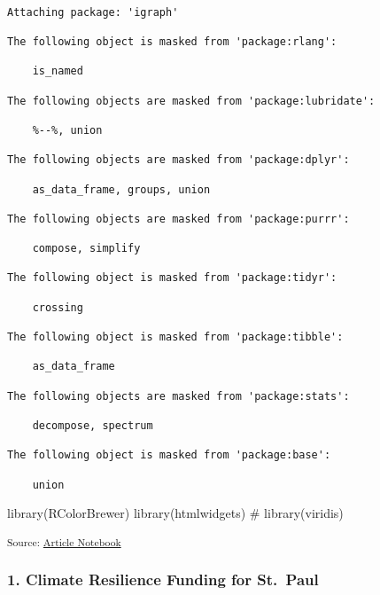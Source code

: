 \documentclass[
  letterpaper,
  DIV=11,
  numbers=noendperiod]{scrartcl}
\newenvironment{Shaded}{\begin{snugshade}}{\end{snugshade}}
\newcommand{\CommentTok}[1]{\textcolor[rgb]{0.37,0.37,0.37}{#1}}
\newcommand{\FunctionTok}[1]{\textcolor[rgb]{0.28,0.35,0.67}{#1}}
\newcommand{\NormalTok}[1]{\textcolor[rgb]{0.00,0.23,0.31}{#1}}
\begin{document}
\begin{verbatim}

Attaching package: 'igraph'

The following object is masked from 'package:rlang':

    is_named

The following objects are masked from 'package:lubridate':

    %--%, union

The following objects are masked from 'package:dplyr':

    as_data_frame, groups, union

The following objects are masked from 'package:purrr':

    compose, simplify

The following object is masked from 'package:tidyr':

    crossing

The following object is masked from 'package:tibble':

    as_data_frame

The following objects are masked from 'package:stats':

    decompose, spectrum

The following object is masked from 'package:base':

    union
\end{verbatim}

\begin{Shaded}
\begin{Highlighting}[]
\FunctionTok{library}\NormalTok{(RColorBrewer)}
\FunctionTok{library}\NormalTok{(htmlwidgets)}
\CommentTok{\# library(viridis)}
\end{Highlighting}
\end{Shaded}

\textsubscript{Source:
\href{https://beeckcenter.github.io/climate-equity-workforce/index-preview.html}{Article
Notebook}}

\subsubsection{1. Climate Resilience Funding for
St.~Paul}\label{climate-resilience-funding-for-st.-paul}
\end{document}
